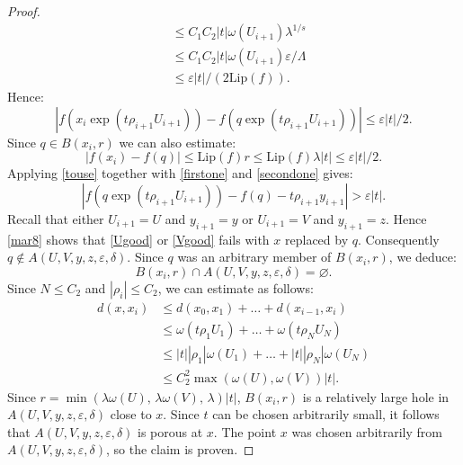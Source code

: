 \documentclass[reqno, 11pt]{amsart}
\theoremstyle{definition}
\theoremstyle{remark}
\numberwithin{theorem}{section}
\numberwithin{equation}{section}
\begin{document}
\begin{proof}
\begin{align*}
&\leq C_{1}C_{2}|t|\omega(U_{i+1})\lambda^{1/s} \\
&\leq C_{1}C_{2}|t|\omega(U_{i+1})\varepsilon / \Lambda \\
&\leq \varepsilon |t|/(2\mathrm{Lip}(f)).
\end{align*}
Hence:
\begin{equation}\label{firstone}
|f(x_{i}\exp(t\rho_{i+1}U_{i+1})) - f(q\exp(t\rho_{i+1}U_{i+1}))|\leq \varepsilon |t|/2.
\end{equation}
Since $q\in B(x_i, r)$ we can also estimate:
\begin{equation}\label{secondone}
|f(x_{i})-f(q)| \leq \mathrm{Lip}(f) r \leq \mathrm{Lip}(f) \lambda |t| \leq \varepsilon |t|/2.
\end{equation}
Applying \eqref{touse} together with \eqref{firstone} and \eqref{secondone} gives:
\begin{equation}\label{mar8} |f(q\exp(t\rho_{i+1}U_{i+1}))-f(q)-t\rho_{i+1}y_{i+1}|>\varepsilon |t|.\end{equation}
Recall that either $U_{i+1}=U$ and $y_{i+1}=y$ or $U_{i+1}=V$ and $y_{i+1}=z$. Hence \eqref{mar8} shows that \eqref{Ugood} or \eqref{Vgood} fails with $x$ replaced by $q$. Consequently $q\notin A(U,V,y,z,\varepsilon,\delta)$. Since $q$ was an arbitrary member of $B(x_{i}, r)$, we deduce:
\[B(x_{i}, r)\cap A(U,V,y,z,\varepsilon,\delta)=\varnothing.\]
Since $N\leq C_{2}$ and $|\rho_{i}|\leq C_{2}$, we can estimate as follows: 
\begin{align*}
d(x,x_{i})&\leq d(x_{0}, x_{1})+ \ldots + d(x_{i-1},x_{i})\\
&\leq  \omega(t\rho_{1}U_{1}) + \ldots + \omega(t \rho_{N}U_{N})\\
&\leq  |t||\rho_{1}| \omega(U_{1}) + \ldots + |t||\rho_{N}|\omega(U_{N})\\
&\leq C_{2}^{2}\max (\omega(U), \omega(V)) |t|.
\end{align*}
Since $r=\min (\lambda \omega(U),\, \lambda \omega(V),\, \lambda) |t|$, $B(x_{i}, r)$ is a relatively large hole in $A(U,V,y,z,\varepsilon,\delta)$ close to $x$. Since $t$ can be chosen arbitrarily small, it follows that $A(U,V,y,z,\varepsilon,\delta)$ is porous at $x$. The point $x$ was chosen arbitrarily from $A(U,V,y,z,\varepsilon,\delta)$, so the claim is proven.
\end{proof}
\end{document}
